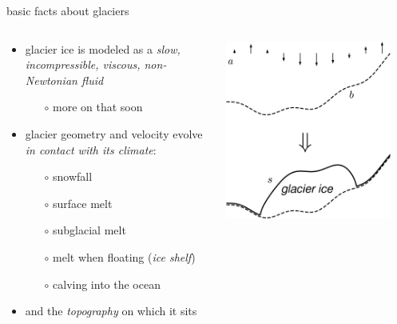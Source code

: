 \documentclass[svgnames,
               hyperref={colorlinks,citecolor=DeepPink4,linkcolor=FireBrick,urlcolor=Maroon},
               usepdftitle=false]  %
               {beamer}
\begin{document}
\begin{frame}{basic facts about glaciers}

\begin{columns}
\begin{column}{0.6\textwidth}
\begin{itemize}
\item glacier ice is modeled as a \emph{slow, incompressible, viscous, non-Newtonian fluid}
    \begin{itemize}
    \item[$\circ$] more on that soon
    \end{itemize}
\item glacier geometry and velocity evolve \emph{in contact with its climate}:
    \begin{itemize}
    \item[$\circ$] snowfall
    \item[$\circ$] surface melt
    \item[$\circ$] subglacial melt
    \item[$\circ$] melt when floating (\emph{ice shelf})
    \item[$\circ$] calving into the ocean
    \end{itemize}
\item and the \emph{topography} on which it sits
\end{itemize}
\end{column}
\begin{column}{0.42\textwidth}
\hfill \includegraphics[width=0.9\textwidth]{images/map-glacier-ice.png}
\end{column}
\end{columns}
\end{frame}
\end{document}
